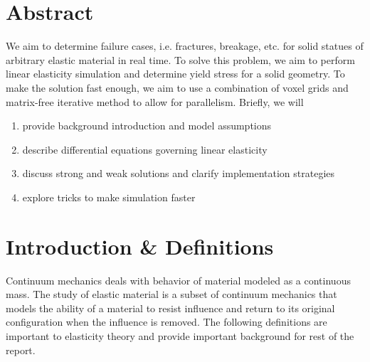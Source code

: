 \documentclass[11pt]{article}
\begin{document}
\section*{Abstract}

We aim to determine failure cases, i.e. fractures, breakage, etc. for solid statues of arbitrary elastic material in real time. To solve this problem, we aim to perform linear elasticity simulation and determine yield stress for a solid geometry. To make the solution fast enough, we aim to use a combination of voxel grids and matrix-free iterative method to allow for parallelism. Briefly, we will
\begin{enumerate}
    \item provide background introduction and model assumptions
    \item describe differential equations governing linear elasticity
    \item discuss strong and weak solutions and clarify implementation strategies
    \item explore tricks to make simulation faster
\end{enumerate}


\section*{Introduction \& Definitions}

Continuum mechanics deals with behavior of material modeled as a continuous mass. The study of elastic material is a subset of continuum mechanics that models the ability of a material to resist influence and return to its original configuration when the influence is removed. The following definitions are important to elasticity theory and provide important background for rest of the report.
\end{document}
